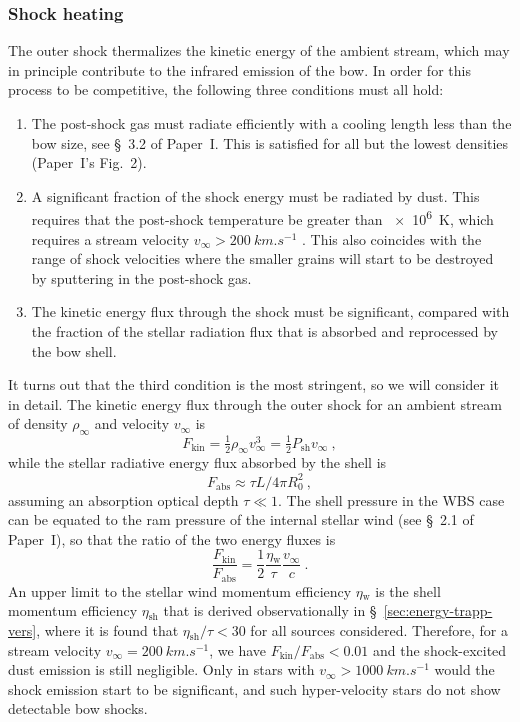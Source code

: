 \documentclass[useAMS, usenatbib, a4paper]{mnras}
\newcommand{\wind}{\ensuremath{_{\text{w}}}}
\newcommand{\trap}{\ensuremath{_{\text{abs}}}}
\newcommand{\ke}{\ensuremath{_{\text{kin}}}}
\newcommand\shell{\ensuremath{_{\text{sh}}}}
\begin{document}
\subsubsection{Shock heating}
\newcommand\kin{\ensuremath{_{\text{kin}}}}
The outer shock thermalizes the kinetic energy of the ambient stream,
which may in principle contribute to the infrared emission of the bow.
In order for this process to be competitive, the following three
conditions must all hold:
\begin{enumerate}[1.]
\item The post-shock gas must radiate efficiently with a cooling
  length less than the bow size, see \S~3.2 of Paper~I.\@
  This is satisfied for all but the lowest densities (Paper~I's
  Fig.~2).
\item A significant fraction of the shock energy must be radiated by
  dust.  This requires that the post-shock temperature be greater than
  \SI{e6}{K}, which requires a stream velocity
  \(v_\infty > \SI{200}{km.s^{-1}}\) \citep{Draine:1981a}.  This also
  coincides with the range of shock velocities where the smaller
  grains will start to be destroyed by sputtering in the post-shock
  gas.
\item The kinetic energy flux through the shock must be significant,
  compared with the fraction of the stellar radiation flux that is
  absorbed and reprocessed by the bow shell.
\end{enumerate}
It turns out that the third condition is the most stringent, so we
will consider it in detail.  The kinetic energy flux through the outer shock for an ambient stream of density \(\rho_\infty\) and velocity \(v_\infty\) is
\begin{equation}
  \label{eq:Fkin}
  F\ke = \tfrac12 \rho_\infty v_\infty^3 = \tfrac12 P\shell v_\infty \ , 
\end{equation}
while the stellar radiative energy flux absorbed by the shell is
\begin{equation}
  \label{eq:Ftrap}
  F\trap \approx \tau L / 4 \pi R_0^2 \ ,
\end{equation}
assuming an absorption optical depth \(\tau \ll 1\). The shell
pressure in the WBS case can be equated to the ram pressure of the
internal stellar wind (see
\S~2.1 of Paper~I), so that the ratio of the two energy fluxes is
\begin{equation}
  \label{eq:F-ratio-shock}
  \frac{F\ke}{F\trap} = \frac12 \frac{\eta\wind}{\tau} \frac{v_\infty}{c} \ .
\end{equation}
An upper limit to the stellar wind momentum efficiency \(\eta\wind\) is
the shell momentum efficiency \(\eta\shell\) that is derived
observationally in \S~\ref{sec:energy-trapp-vers}, where it is found
that \(\eta\shell / \tau < 30\) for all sources considered.  Therefore, for
a stream velocity \(v_\infty = \SI{200}{km.s^{-1}}\), we have
\(F\ke/F\trap < 0.01\) and the shock-excited dust emission is still
negligible.  Only in stars with \(v_\infty > \SI{1000}{km.s^{-1}}\) would
the shock emission start to be significant, and such hyper-velocity
stars \citep{Brown:2015a} do not show detectable bow shocks.
\end{document}
